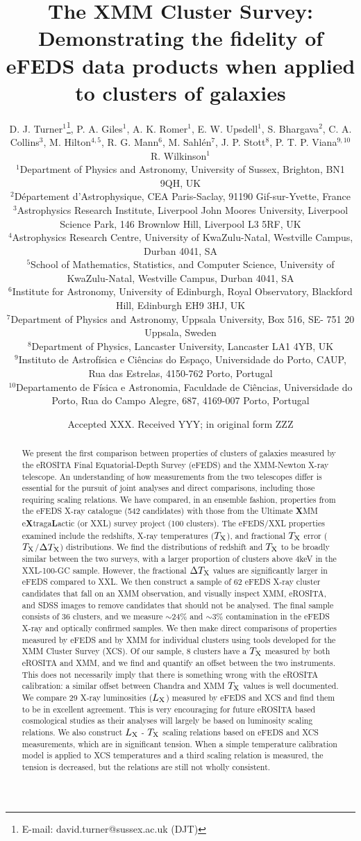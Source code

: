 \documentclass[fleqn,usenatbib]{mnras}
\title[XCS: Demonstrating the fidelity of eFEDS data products when applied to clusters of galaxies]{The XMM Cluster Survey: Demonstrating the fidelity of eFEDS data products when applied to clusters of galaxies}
\author[D. J. Turner et al.]
{D. J. Turner$^{1}$\thanks{E-mail: david.turner@sussex.ac.uk (DJT)}\orcidA{},
P. A. Giles$^{1}$\orcidB{},
A. K. Romer$^{1}$\orcidC{},
E. W. Upsdell$^{1}$\orcidG{},
S. Bhargava$^{2}$,
C. A. Collins$^{3}$,
\newauthor
M. Hilton$^{4,5}$\orcidJ{},
R. G. Mann$^{6}$\orcidH{},
M. Sahl\'en$^{7}$\orcidI{},
J. P. Stott$^{8}$\orcidF{},
P. T. P. Viana$^{9,10}$\orcidE{}
R. Wilkinson$^{1}$\orcidD{}
\\
$^{1}$Department of Physics and Astronomy, University of Sussex, Brighton, BN1 9QH, UK\\
$^{2}$Département d’Astrophysique, CEA Paris-Saclay, 91190 Gif-sur-Yvette, France\\
$^{3}$Astrophysics Research Institute, Liverpool John Moores University, Liverpool Science Park, 146 Brownlow Hill, Liverpool L3 5RF, UK \\
$^{4}$Astrophysics Research Centre, University of KwaZulu-Natal, Westville Campus, Durban 4041, SA \\
$^{5}$School of Mathematics, Statistics, and Computer Science, University of KwaZulu-Natal, Westville Campus, Durban 4041, SA \\
$^{6}$Institute for Astronomy, University of Edinburgh, Royal Observatory, Blackford Hill, Edinburgh EH9 3HJ, UK \\
$^{7}$Department of Physics and Astronomy, Uppsala University, Box 516, SE- 751 20 Uppsala, Sweden\\
$^{8}$Department of Physics, Lancaster University, Lancaster LA1 4YB, UK \\
$^{9}$Instituto de Astrof\'isica e Ci\^{e}ncias do Espa\c co, Universidade do Porto, CAUP, Rua das Estrelas, 4150-762 Porto, Portugal \\
$^{10}$Departamento de F\'isica e Astronomia, Faculdade de Ci\^{e}ncias, Universidade do Porto, Rua do Campo Alegre, 687, 4169-007 Porto, Portugal \\
}
\date{Accepted XXX. Received YYY; in original form ZZZ}
\begin{document}
\label{firstpage}
\pagerange{\pageref{firstpage}--\pageref{lastpage}}
\maketitle

\begin{abstract}
We present the first comparison between properties of clusters of galaxies measured by the eROSITA Final Equatorial-Depth Survey (eFEDS) and the XMM-Newton X-ray telescope. An understanding of how measurements from the two telescopes differ is essential for the pursuit of joint analyses and direct comparisons, including those requiring scaling relations.
We have compared, in an ensemble fashion, properties from the eFEDS X-ray catalogue (542 candidates) with those from the Ultimate {\bf X}MM e{\bf X}traga{\bf L}actic (or XXL) survey project (100 clusters).
The eFEDS/XXL properties examined include the redshifts, X-ray temperatures ($T_{\rm X}$), and fractional $T_{\rm X}$ error ($T_{\rm X}$/$\Delta T_{\rm X}$) distributions. We find the distributions of redshift and $T_{\rm X}$ to be broadly similar between the two surveys, with a larger proportion of clusters above 4keV in the XXL-100-GC sample. However, the fractional $\Delta T_{\rm X}$ values are significantly larger in eFEDS compared to XXL.
We then construct a sample of 62 eFEDS X-ray cluster candidates that fall on an XMM observation, and visually inspect XMM, eROSITA, and SDSS images to remove candidates that should not be analysed. The final sample consists of 36 clusters, and we measure ${\sim}$24\% and ${\sim}$3\% contamination in the eFEDS X-ray and optically confirmed samples.
We then make direct comparisons of properties measured by eFEDS and by XMM for individual clusters using tools developed for the XMM Cluster Survey (XCS). Of our sample, 8 clusters have a $T_{\rm X}$ measured by both eROSITA and XMM, and we find and quantify an offset between the two instruments. This does not necessarily imply that there is something wrong with the eROSITA calibration: a similar offset between Chandra and XMM $T_{\rm X}$ values is well documented.
We compare 29 X-ray luminosities ($L_{\rm X}$) measured by eFEDS and XCS and find them to be in excellent agreement. This is very encouraging for future eROSITA based cosmological studies as their analyses will largely be based on luminosity scaling relations. We also construct $L_{\rm X}$ - $T_{\rm X}$ scaling relations based on eFEDS and XCS measurements, which are in significant tension. When a simple temperature calibration model is applied to XCS temperatures and a third scaling relation is measured, the tension is decreased, but the relations are still not wholly consistent.

\end{abstract}
\end{document}
